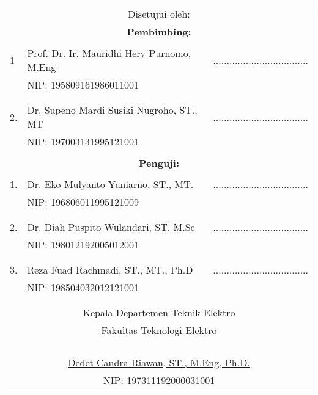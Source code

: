 \begin{table}[!h]
\centering
\vspace{-8ex}
\caption*{}
\label*{}
\begin{tabular}{lll}
	\multicolumn{3}{c}{Disetujui oleh:} \\
	\multicolumn{3}{c}{\textbf{Pembimbing:}} \\
	&  &  \\
	1 & Prof. Dr. Ir. Mauridhi Hery Purnomo, M.Eng & ................................... \\
	& NIP: 195809161986011001 &  \\
	&  &  \\
	&  &  \\
	2. & Dr. Supeno Mardi Susiki Nugroho, ST., MT & ................................... \\
	& NIP: 197003131995121001 &  \\
	&  &  \\
	\multicolumn{3}{c}{\textbf{Penguji:}} \\
	&  &  \\
	1. & Dr. Eko Mulyanto Yuniarno, ST., MT. & ................................... \\
	& NIP: 196806011995121009 &  \\
	&  &  \\
	&  &  \\
	2. & Dr. Diah Puspito Wulandari, ST. M.Sc & ................................... \\
	& NIP: 198012192005012001 &  \\
	&  &  \\
	&  &  \\
	3. & Reza Fuad Rachmadi, ST., MT., Ph.D & ................................... \\
	& NIP: 198504032012121001 &  \\
	&  &  \\
	&  &  \\
	\multicolumn{3}{c}{Kepala Departemen Teknik Elektro} \\
	\multicolumn{3}{c}{Fakultas Teknologi Elektro} \\
	&  &  \\
	&  &  \\
	&  &  \\
	&  &  \\
	\multicolumn{3}{c}{\underline{Dedet Candra Riawan, ST., M.Eng, Ph.D.}} \\
	\multicolumn{3}{c}{NIP: 197311192000031001}
\end{tabular}
\end{table}

\newpage
